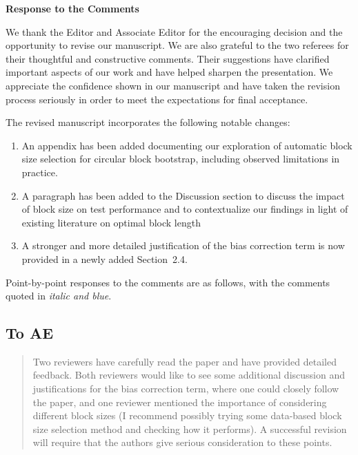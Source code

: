 \documentclass[12pt]{article}
\newenvironment{comment}%
{\begin{quotation}\noindent\small\it\color{darkblue}\ignorespaces%
}{\end{quotation}}
\begin{document}
\begin{center}
  {\Large\bf Response to the Comments}
\end{center}


We thank the Editor and Associate Editor for the encouraging decision
and the opportunity to revise our manuscript. We are also grateful to
the two referees for their thoughtful and constructive comments. Their
suggestions have clarified important aspects of our work and have
helped sharpen the presentation. We appreciate the confidence shown in
our manuscript and have taken the revision process seriously in order
to meet the expectations for final acceptance.


The revised manuscript incorporates the following notable changes:
\begin{enumerate}
\item An appendix has been added documenting our exploration of
  automatic block size selection for circular block bootstrap,
  including observed limitations in practice.
\item  A paragraph has been added to the Discussion section to
  discuss the impact of block size on test performance and to
  contextualize our findings in light of existing literature on
  optimal block length
\item A stronger and more detailed justification of the bias
  correction term is now provided in a newly added Section~2.4.
\end{enumerate}


Point-by-point responses to the comments are as follows, with the
comments quoted in \emph{\color{darkblue} italic and blue}.


\subsection*{To AE}

\begin{comment}
Two reviewers have carefully read the paper and have provided detailed feedback.  Both reviewers would like to see some additional discussion and justifications for the bias correction term, where one could closely follow the \citet{babu2004goodness} paper, and one reviewer mentioned the importance of considering different block sizes (I recommend possibly trying some data-based block size selection method and checking how it performs).  A successful revision will require that the authors give serious consideration to these points.
\end{comment}
\end{document}
